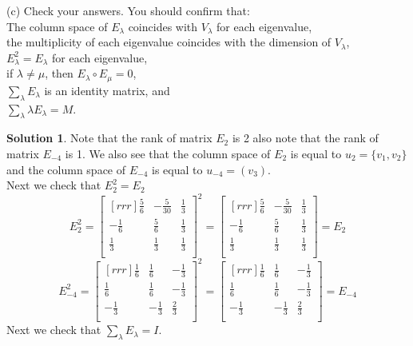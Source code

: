 \documentclass[12pt]{article}
\theoremstyle{definition}
\newtheorem*{solution}{Solution} %
\theoremstyle{plain}
\begin{document}
(c) Check your answers.  You should confirm that: \\
The column space of $E_\lambda$ coincides with $V_\lambda$ for each eigenvalue, \\
the multiplicity of each eigenvalue coincides with the dimension of $V_\lambda$, \\
$E_\lambda^2=E_\lambda$ for each eigenvalue, \\
if $\lambda\neq\mu$, then $E_\lambda\circ E_\mu=0$, \\
$\sum_\lambda E_\lambda$ is an identity matrix, and \\
$\sum_\lambda \lambda E_\lambda=M$. \\

\begin{solution}
Note that the rank of matrix $E_2$ is 2 also note that the rank of matrix $E_{-4}$ is 1. We also see that the column space of $E_2$ is equal to $u_2=\{v_1,v_2\}$ and the column space of $E_{-4}$ is equal to $u_{-4}=(v_3)$.\\
Next we check that $E_2^2=E_2$
\[ E_2^2 = \begin{bmatrix}[rrr]\frac{5}{6}&-\frac{5}{30}&\frac{1}{3}\\-\frac{1}{6}&\frac{5}{6}&\frac{1}{3}\\\frac{1}{3}&\frac{1}{3}&\frac{1}{3}\\\end{bmatrix}^2 = \begin{bmatrix}[rrr]\frac{5}{6}&-\frac{5}{30}&\frac{1}{3}\\-\frac{1}{6}&\frac{5}{6}&\frac{1}{3}\\\frac{1}{3}&\frac{1}{3}&\frac{1}{3}\\\end{bmatrix} = E_2 \]
\[ E_{-4}^2 = \begin{bmatrix}[rrr]\frac{1}{6}&\frac{1}{6}&-\frac{1}{3}\\\frac{1}{6}&\frac{1}{6}&-\frac{1}{3}\\-\frac{1}{3}&-\frac{1}{3}&\frac{2}{3}\\\end{bmatrix}^2 = \begin{bmatrix}[rrr]\frac{1}{6}&\frac{1}{6}&-\frac{1}{3}\\\frac{1}{6}&\frac{1}{6}&-\frac{1}{3}\\-\frac{1}{3}&-\frac{1}{3}&\frac{2}{3}\\\end{bmatrix} = E_{-4} \]
Next we check that $\sum_\lambda E_\lambda = I$.

\end{solution}
\end{document}
